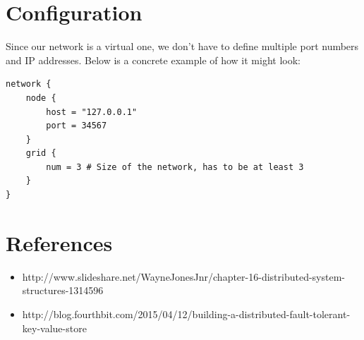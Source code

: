 \documentclass[a4paper, 11pt]{article}
\begin{document}
\section{Configuration}

\noindent Since our network is a virtual one, we don't have to define multiple port numbers and IP addresses. Below is a concrete example of how it might look:

\begin{verbatim}
network {
    node {
        host = "127.0.0.1"
        port = 34567
    }
    grid {
        num = 3 # Size of the network, has to be at least 3
    }
}
\end{verbatim}


\section{References}
\begin{itemize}
	\item http://www.slideshare.net/WayneJonesJnr/chapter-16-distributed-system-structures-1314596
	\item 
	http://blog.fourthbit.com/2015/04/12/building-a-distributed-fault-tolerant-key-value-store
\end{itemize}
\end{document}
